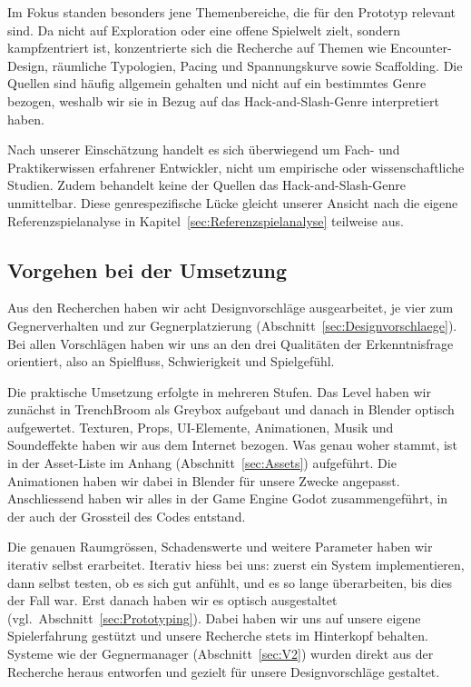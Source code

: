 \documentclass[../Main.tex]{subfiles}
\begin{document}
Im Fokus standen besonders jene Themenbereiche, die für den Prototyp relevant sind. Da  nicht auf Exploration oder eine offene Spielwelt zielt, sondern kampfzentriert ist, konzentrierte sich die Recherche auf Themen wie Encounter-Design, räumliche Typologien, Pacing und Spannungskurve sowie Scaffolding. Die Quellen sind häufig allgemein gehalten und nicht auf ein bestimmtes Genre bezogen, weshalb wir sie in Bezug auf das Hack-and-Slash-Genre interpretiert haben.

Nach unserer Einschätzung handelt es sich überwiegend um Fach- und Praktikerwissen erfahrener Entwickler, nicht um empirische oder wissenschaftliche Studien. Zudem behandelt keine der Quellen das Hack-and-Slash-Genre unmittelbar. Diese genrespezifische Lücke gleicht unserer Ansicht nach die eigene Referenzspielanalyse in Kapitel~\ref{sec:Referenzspielanalyse} teilweise aus.

\subsection{Vorgehen bei der Umsetzung} \label{sec:VorgehenUmsetzung}
Aus den Recherchen haben wir acht Designvorschläge ausgearbeitet, je vier zum Gegnerverhalten und zur Gegnerplatzierung (Abschnitt~\ref{sec:Designvorschlaege}). Bei allen Vorschlägen haben wir uns an den drei Qualitäten der Erkenntnisfrage orientiert, also an Spielfluss, Schwierigkeit und Spielgefühl.

Die praktische Umsetzung erfolgte in mehreren Stufen. Das Level haben wir zunächst in TrenchBroom als Greybox aufgebaut und danach in Blender optisch aufgewertet. Texturen, Props, UI-Elemente, Animationen, Musik und Soundeffekte haben wir aus dem Internet bezogen. Was genau woher stammt, ist in der Asset-Liste im Anhang (Abschnitt~\ref{sec:Assets}) aufgeführt. Die Animationen haben wir dabei in Blender für unsere Zwecke angepasst. Anschliessend haben wir alles in der Game Engine Godot zusammengeführt, in der auch der Grossteil des Codes entstand.

Die genauen Raumgrössen, Schadenswerte und weitere Parameter haben wir iterativ selbst erarbeitet. Iterativ hiess bei uns: zuerst ein System implementieren, dann selbst testen, ob es sich gut anfühlt, und es so lange überarbeiten, bis dies der Fall war. Erst danach haben wir es optisch ausgestaltet (vgl.\ Abschnitt~\ref{sec:Prototyping}). Dabei haben wir uns auf unsere eigene Spielerfahrung gestützt und unsere Recherche stets im Hinterkopf behalten. Systeme wie der Gegnermanager (Abschnitt~\ref{sec:V2}) wurden direkt aus der Recherche heraus entworfen und gezielt für unsere Designvorschläge gestaltet.
\end{document}
